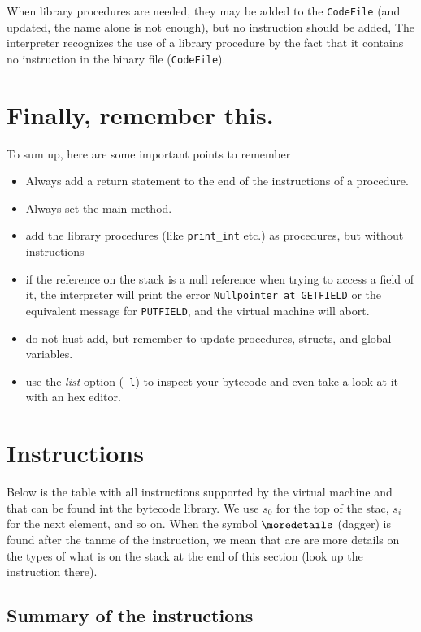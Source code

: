 \documentclass[11pt]{article}
\begin{document}

When library procedures are needed, they may be added to the \texttt{CodeFile}
(and updated, the name alone is not enough), but no instruction should be
added, The interpreter recognizes the use of a library procedure by the
fact that it contains no instruction in the binary file (\texttt{CodeFile}).
\section{Finally, remember this.}
\label{sec:orgd8d8d72}
\label{org7f406a6}


To sum up, here are some important points to remember

\begin{itemize}
\item Always add a return statement to the end of the instructions of a
procedure.
\item Always set the main method.
\item add the library procedures (like \texttt{print\_int} etc.) as procedures, but
without instructions
\item if the reference on the stack is a null reference when trying to access a
field of it, the interpreter will print the error \texttt{Nullpointer at
  GETFIELD} or the equivalent message for \texttt{PUTFIELD}, and the virtual
machine will abort.
\item do not hust add, but remember to update procedures, structs, and global
variables.
\item use the \emph{list} option (\texttt{-l}) to inspect your bytecode and even take a
look at it with an hex editor.
\end{itemize}
\section{Instructions}
\label{sec:org986d14f}
\label{org20ead7f}

Below is the table with all instructions supported by the virtual machine
and that can be found int the bytecode library. We use \(s_0\) for the top of
the stac, \(s_i\) for the next element, and so on. When the symbol
\(\moredetails\) (dagger) is found after the tanme of the instruction, we
mean that are are more details on the types of what is on the stack at the
end of this section (look up the instruction there).


\subsection{Summary of the instructions}
\label{sec:org3b62caf}
\end{document}
